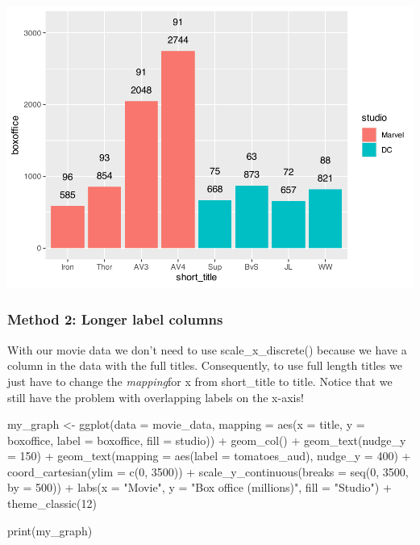 \documentclass[
]{krantz}
\makeatletter
\newenvironment{Shaded}{\begin{snugshade}}{\end{snugshade}}
\newcommand{\AttributeTok}[1]{\textcolor[rgb]{0.61,0.61,0.61}{#1}}
\newcommand{\DecValTok}[1]{\textcolor[rgb]{0.06,0.06,0.06}{#1}}
\newcommand{\FunctionTok}[1]{\textcolor[rgb]{0,0,0}{#1}}
\newcommand{\NormalTok}[1]{#1}
\newcommand{\OtherTok}[1]{\textcolor[rgb]{0.37,0.37,0.37}{#1}}
\newcommand{\SpecialCharTok}[1]{\textcolor[rgb]{0,0,0}{#1}}
\newcommand{\StringTok}[1]{\textcolor[rgb]{0.5,0.5,0.5}{#1}}
\newenvironment{kframe}{%
\medskip{}
\setlength{\fboxsep}{.8em}
 \def\at@end@of@kframe{}%
 \ifinner\ifhmode%
  \def\at@end@of@kframe{\end{minipage}}%
  \begin{minipage}{\columnwidth}%
 \fi\fi%
 \def\FrameCommand##1{\hskip\@totalleftmargin \hskip-\fboxsep
 \colorbox{shadecolor}{##1}\hskip-\fboxsep
     \hskip-\linewidth \hskip-\@totalleftmargin \hskip\columnwidth}%
 \MakeFramed {\advance\hsize-\width
   \@totalleftmargin\z@ \linewidth\hsize
   \@setminipage}}%
 {\par\unskip\endMakeFramed%
 \at@end@of@kframe}
\renewenvironment{Shaded}{\begin{kframe}}{\end{kframe}}
\makeatother
\begin{document}
\includegraphics[width=0.65\linewidth]{bookdown_files/figure-latex/unnamed-chunk-120-1}

\hypertarget{method-2-longer-label-columns}{%
\subsubsection{Method 2: Longer label columns}\label{method-2-longer-label-columns}}

With our movie data we don't need to use scale\_x\_discrete() because we have a column in the data with the full titles. Consequently, to use full length titles we just have to change the \emph{mapping}for x from short\_title to title. Notice that we still have the problem with overlapping labels on the x-axis!

\begin{Shaded}
\begin{Highlighting}[]
\NormalTok{my\_graph }\OtherTok{\textless{}{-}} \FunctionTok{ggplot}\NormalTok{(}\AttributeTok{data =}\NormalTok{ movie\_data,}
           \AttributeTok{mapping =} \FunctionTok{aes}\NormalTok{(}\AttributeTok{x =}\NormalTok{ title,}
                         \AttributeTok{y =}\NormalTok{ boxoffice,}
                         \AttributeTok{label =}\NormalTok{ boxoffice, }
                         \AttributeTok{fill =}\NormalTok{ studio)) }\SpecialCharTok{+}
  \FunctionTok{geom\_col}\NormalTok{() }\SpecialCharTok{+}
  \FunctionTok{geom\_text}\NormalTok{(}\AttributeTok{nudge\_y =} \DecValTok{150}\NormalTok{)  }\SpecialCharTok{+}
  \FunctionTok{geom\_text}\NormalTok{(}\AttributeTok{mapping =} \FunctionTok{aes}\NormalTok{(}\AttributeTok{label =}\NormalTok{ tomatoes\_aud), }
            \AttributeTok{nudge\_y =} \DecValTok{400}\NormalTok{) }\SpecialCharTok{+}
  \FunctionTok{coord\_cartesian}\NormalTok{(}\AttributeTok{ylim =} \FunctionTok{c}\NormalTok{(}\DecValTok{0}\NormalTok{, }\DecValTok{3500}\NormalTok{)) }\SpecialCharTok{+}
  \FunctionTok{scale\_y\_continuous}\NormalTok{(}\AttributeTok{breaks =} \FunctionTok{seq}\NormalTok{(}\DecValTok{0}\NormalTok{, }\DecValTok{3500}\NormalTok{, }\AttributeTok{by =} \DecValTok{500}\NormalTok{)) }\SpecialCharTok{+}
  \FunctionTok{labs}\NormalTok{(}\AttributeTok{x =} \StringTok{"Movie"}\NormalTok{,}
       \AttributeTok{y =} \StringTok{"Box office (millions)"}\NormalTok{,}
       \AttributeTok{fill =} \StringTok{"Studio"}\NormalTok{) }\SpecialCharTok{+}
  \FunctionTok{theme\_classic}\NormalTok{(}\DecValTok{12}\NormalTok{)}
  

\FunctionTok{print}\NormalTok{(my\_graph)}
\end{Highlighting}
\end{Shaded}
\end{document}
